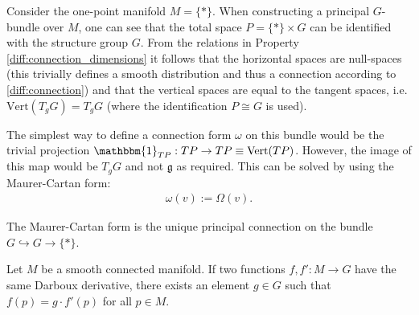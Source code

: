     \begin{construct}
        Consider the one-point manifold $M=\{\ast\}$. When constructing a principal $G$-bundle over $M$, one can see that the total space $P=\{\ast\}\times G$ can be identified with the structure group $G$. From the relations in Property \ref{diff:connection_dimensions} it follows that the horizontal spaces are null-spaces (this trivially defines a smooth distribution and thus a connection according to \ref{diff:connection}) and that the vertical spaces are equal to the tangent spaces, i.e. $\text{Vert}(T_gG)=T_gG$ (where the identification $P\cong G$ is used).

        The simplest way to define a connection form $\omega$ on this bundle would be the trivial projection $\mathbbm{1}_{TP}:TP\rightarrow TP\equiv\text{Vert}(TP)$. However, the image of this map would be $T_gG$ and not $\mathfrak{g}$ as required. This can be solved by using the Maurer-Cartan form:
        \begin{gather}
            \omega(v) := \Omega(v).
        \end{gather}
    \end{construct}
    \begin{property}
        The Maurer-Cartan form is the unique principal connection on the bundle $G\hookrightarrow G\rightarrow\{\ast\}$.
    \end{property}

    \begin{property}
        Let $M$ be a smooth connected manifold. If two functions $f,f':M\rightarrow G$ have the same Darboux derivative, there exists an element $g\in G$ such that $f(p)=g\cdot f'(p)$ for all $p\in M$.
    \end{property}

